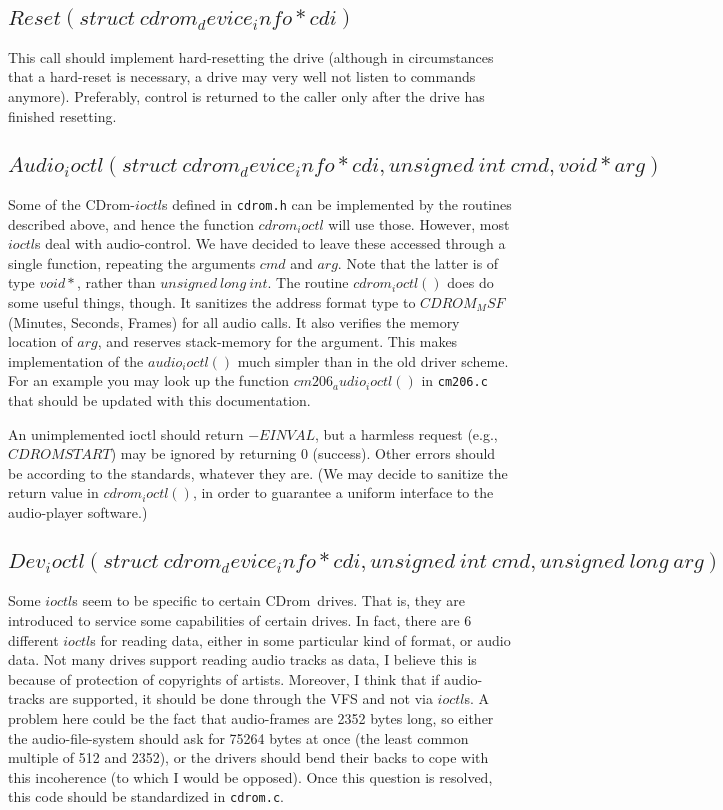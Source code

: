 \documentclass{article}
\def\cdrom{{\sc CDrom}}
\def\cdromc{{\tt cdrom.c}}
\begin{document}
\subsection{$Reset(struct\ cdrom_device_info * cdi)$}

This call should implement hard-resetting the drive (although in
circumstances that a hard-reset is necessary, a drive may very well
not listen to commands anymore). Preferably, control is returned to the
caller only after the drive has finished resetting.

\subsection{$Audio_ioctl(struct\ cdrom_device_info * cdi, unsigned\
  int\ cmd, void * arg)$}

Some of the \cdrom-$ioctl$s defined in {\tt cdrom.h} can be
implemented by the routines described above, and hence the function
$cdrom_ioctl$ will use those. However, most $ioctl$s deal with
audio-control. We have decided to leave these accessed through a
single function, repeating the arguments $cmd$ and $arg$. Note that
the latter is of type $void*{}$, rather than $unsigned\ long\
int$. The routine $cdrom_ioctl()$ does do some useful things,
though. It sanitizes the address format type to $CDROM_MSF$ (Minutes,
Seconds, Frames) for all audio calls. It also verifies the memory
location of $arg$, and reserves stack-memory for the argument. This
makes implementation of the $audio_ioctl()$ much simpler than in the
old driver scheme. For an example you may look up the function
$cm206_audio_ioctl()$ in {\tt cm206.c} that should be updated with
this documentation. 

An unimplemented ioctl should return $-EINVAL$, but a harmless request
(e.g., $CDROMSTART$) may be ignored by returning 0 (success). Other
errors should be according to the standards, whatever they are. (We
may decide to sanitize the return value in $cdrom_ioctl()$, in order
to guarantee a uniform interface to the audio-player software.)

\subsection{$Dev_ioctl(struct\ cdrom_device_info * cdi, unsigned\ int\
  cmd, unsigned\ long\ arg)$}

Some $ioctl$s seem to be specific to certain \cdrom\ drives. That is,
they are introduced to service some capabilities of certain drives. In
fact, there are 6 different $ioctl$s for reading data, either in some
particular kind of format, or audio data. Not many drives support
reading audio tracks as data, I believe this is because of protection
of copyrights of artists. Moreover, I think that if audio-tracks are
supported, it should be done through the VFS and not via $ioctl$s. A
problem here could be the fact that audio-frames are 2352 bytes long,
so either the audio-file-system should ask for 75264 bytes at once
(the least common multiple of 512 and 2352), or the drivers should
bend their backs to cope with this incoherence (to which I would be
opposed). Once this question is resolved, this code should be
standardized in \cdromc.
\end{document}
